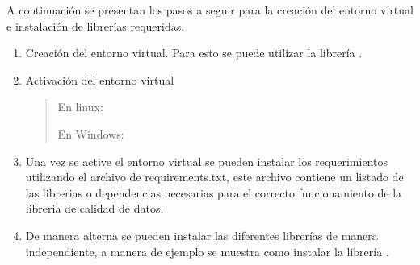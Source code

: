 \documentclass[letterpaper,10pt,openany,spanish]{sphinxmanual}
\begin{document}
A continuación se presentan los pasos a seguir para la creación del entorno virtual e instalación de librerías requeridas.
\begin{enumerate}
%
\item {} 
Creación del entorno virtual. Para esto se puede utilizar la librería .
\begin{quote}

\begin{sphinxVerbatim}[commandchars=\\\{\}]
\end{sphinxVerbatim}
\end{quote}

\item {} 
Activación del entorno virtual
\begin{quote}

En linux:

\begin{sphinxVerbatim}[commandchars=\\\{\}]
\end{sphinxVerbatim}

En Windows:

\begin{sphinxVerbatim}[commandchars=\\\{\}]
\end{sphinxVerbatim}
\end{quote}

\item {} 
Una vez se active el entorno virtual se pueden instalar los requerimientos utilizando el archivo de requirements.txt, este archivo contiene un listado de las librerias o dependencias necesarias para el correcto funcionamiento de la libreria de calidad de datos.
\begin{quote}

\begin{sphinxVerbatim}[commandchars=\\\{\}]
\end{sphinxVerbatim}
\end{quote}

\item {} 
De manera alterna se pueden instalar las diferentes librerías de manera independiente, a manera de ejemplo se muestra como instalar la librería .
\begin{quote}


\end{quote}
\end{enumerate}
\end{document}
